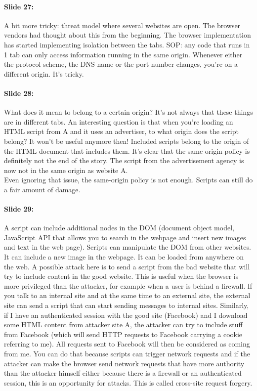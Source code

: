 \documentclass[10pt,a4paper]{report}
\begin{document}
\paragraph{Slide 27:} A bit more tricky: threat model where several websites are open. The browser vendors had thought about this from the beginning. The browser implementation has started implementing isolation between the tabs. SOP: any code that runs in 1 tab can only access information running in the same origin. Whenever either the protocol scheme, the DNS name or the port number changes, you're on a different origin. It's tricky. 

\paragraph{Slide 28:} What does it mean to belong to a certain origin? It's not always that these things are in different tabs. An interesting question is that when you're loading an HTML script from A and it uses an advertiser, to what origin does the script belong? It won't be useful anymore then! Included scripts belong to the origin of the HTML document that includes them. It's clear that the same-origin policy is definitely not the end of the story. The script from the advertisement agency is now not in the same origin as website A.\\
Even ignoring that issue, the same-origin policy is not enough. Scripts can still do a fair amount of damage.

\paragraph{Slide 29:} A script can include additional nodes in the DOM (document object model, JavaScript API that allows you to search in the webpage and insert new images and text in the web page). Scripts can manipulate the DOM from other websites. It can include a new image in the webpage. It can be loaded from anywhere on the web. A possible attack here is to send a script from the bad website that will try to include content in the good website. This is useful when the browser is more privileged than the attacker, for example when a user is behind a firewall. If you talk to an internal site and at the same time to an external site, the external site can send a script that can start sending messages to internal sites. Similarly, if I have an authenticated session with the good site (Facebook) and I download some HTML content from attacker site A, the attacker can try to include stuff from Facebook (which will send HTTP requests to Facebook carrying a cookie referring to me). All requests sent to Facebook will then be considered as coming from me. You can do that because scripts can trigger network requests and if the attacker can make the browser send network requests that have more authority than the attacker himself either because there is a firewall or an authenticated session, this is an opportunity for attacks. This is called cross-site request forgery.
\end{document}
